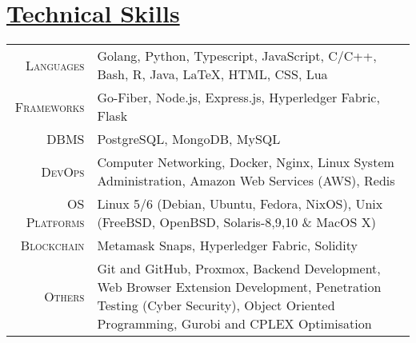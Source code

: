 \documentclass[a4paper,10pt]{extarticle} %
\begin{document}
\begin{itemize}[leftmargin=0.55cm, rightmargin=0.2cm, label={\Large\textbullet}]

\end{itemize}

 \vspace{+0.4cm} \section{\textcolor{primary}{\href{https://www.github.com/proffapt/bodhitree}{Technical Skills}}}

 \vspace{+0.2cm}

 \begin{tabular}{r|p{15cm}}
 \textsc{Languages} & Golang, Python, Typescript, JavaScript, C/C++, Bash, R, Java, LaTeX, HTML, CSS, Lua\\
 \textsc{Frameworks} & Go-Fiber, Node.js, Express.js, Hyperledger Fabric, Flask \\
 \textsc{DBMS} & PostgreSQL, MongoDB, MySQL \\
 \textsc{DevOps} & Computer Networking, Docker, Nginx, Linux System Administration, Amazon Web Services (AWS), Redis \\
 \textsc{OS Platforms} & Linux 5/6 (Debian, Ubuntu, Fedora, NixOS), Unix (FreeBSD, OpenBSD, Solaris-8,9,10 \& MacOS X) \\
 \textsc{Blockchain} & Metamask Snaps, Hyperledger Fabric, Solidity \\
 \textsc{Others} & Git and GitHub, Proxmox, Backend Development, Web Browser Extension Development, Penetration Testing (Cyber Security), Object Oriented Programming, Gurobi and CPLEX Optimisation \\
 
 
\end{tabular}

\end{document}

